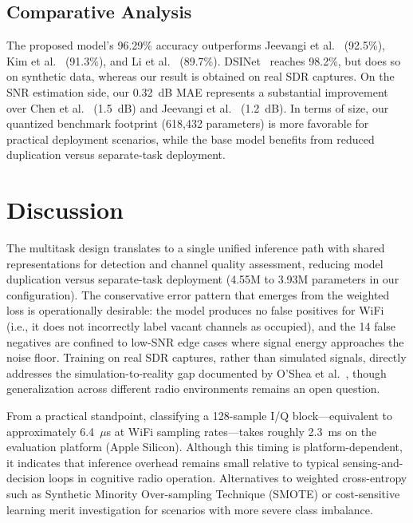 \documentclass[conference]{IEEEtran}
\begin{document}
\subsection{Comparative Analysis}

The proposed model's 96.29\% accuracy outperforms Jeevangi et al.~\cite{jeevangi2022deep} (92.5\%), Kim et al.~\cite{kim2020deep} (91.3\%), and Li et al.~\cite{li2020deep} (89.7\%). DSINet~\cite{kim2023multitask} reaches 98.2\%, but does so on synthetic data, whereas our result is obtained on real SDR captures. On the SNR estimation side, our 0.32~dB MAE represents a substantial improvement over Chen et al.~\cite{chen2021multitask} (1.5~dB) and Jeevangi et al.~\cite{jeevangi2022deep} (1.2~dB). In terms of size, our quantized benchmark footprint (618,432 parameters) is more favorable for practical deployment scenarios, while the base model benefits from reduced duplication versus separate-task deployment.

\section{Discussion}

The multitask design translates to a single unified inference path with shared representations for detection and channel quality assessment, reducing model duplication versus separate-task deployment (4.55M to 3.93M parameters in our configuration). The conservative error pattern that emerges from the weighted loss is operationally desirable: the model produces no false positives for WiFi (i.e., it does not incorrectly label vacant channels as occupied), and the 14 false negatives are confined to low-SNR edge cases where signal energy approaches the noise floor. Training on real SDR captures, rather than simulated signals, directly addresses the simulation-to-reality gap documented by O'Shea et al.~\cite{oshea2018over}, though generalization across different radio environments remains an open question.

From a practical standpoint, classifying a 128-sample I/Q block—equivalent to approximately 6.4~$\mu$s at WiFi sampling rates—takes roughly 2.3~ms on the evaluation platform (Apple Silicon). Although this timing is platform-dependent, it indicates that inference overhead remains small relative to typical sensing-and-decision loops in cognitive radio operation. Alternatives to weighted cross-entropy such as Synthetic Minority Over-sampling Technique (SMOTE) or cost-sensitive learning merit investigation for scenarios with more severe class imbalance.
\end{document}
